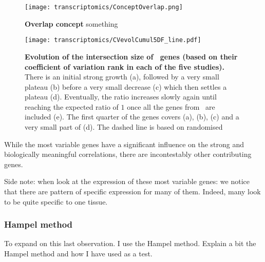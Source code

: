 \begin{figure}[!htpb]
    \texttt{[image: transcriptomics/ConceptOverlap.png]}\centering
    \caption[Overlap concept explaination]{\label{fig:overlapConcept}%
    \textbf{Overlap concept} something}
\end{figure}


\begin{figure}[!htpb]
    \texttt{[image: transcriptomics/CVevolCumul5DF\_line.pdf]}\centering
    \caption[Evolution of the intersection size of \setOne\ genes (ranked by cv)]%
    {\label{fig:cvEvol5DF}\textbf{Evolution of the intersection size
    of \setOne\ genes (based on their coefficient of variation rank
    in each of the five studies).}
    There is an initial strong growth (a),
    followed by a very small plateau (b)
    before a very small decrease (c)
    which then settles a plateau (d).
    Eventually, the ratio increases slowly again
    until reaching the expected ratio of $1$ once all the genes from \setOne\
    are included (e).
    The first quarter of the genes covers (a), (b), (c) and a very small part of (d).
    The dashed line is based on randomised }
\end{figure}


While the most variable genes have a significant influence
on the strong and biologically meaningful correlations,
there are incontestably other contributing genes.

Side note: when look at the expression of these most variable genes:
we notice that there are pattern of specific expression for many of them.
Indeed, many look to be quite specific to one tissue.

\begin{comment}
\begin{figure}[!htpb]
    \texttt{[image: transcriptomics/Heatmap\_25p\_mostCoeffVariablesgenesTheirExpression.pdf]}\centering
    \caption[Expression of the most common variable genes]{\label{fig:expressionMostvariableG}
    \textbf{Expression of the most common variable genes.} }
\end{figure}
\end{comment}

\subsubsection{Hampel method}
To expand on this last observation. I use the Hampel method.
Explain a bit the Hampel method and how I have used as a test.

